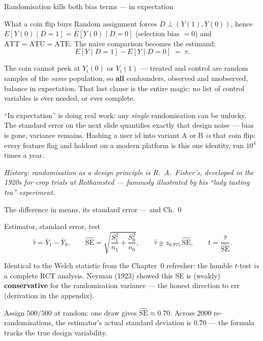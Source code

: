 \documentclass[aspectratio=169,11pt]{beamer}
\begin{document}
\begin{frame}{Randomisation kills both bias terms --- in expectation}
  \fontsize{7}{8.4}\selectfont
  \begin{block}{What a coin flip buys}
    Random assignment forces $D \perp (Y(1),Y(0))$, hence
    $E[Y(0)\mid D{=}1] = E[Y(0)\mid D{=}0]$ (selection bias $=0$) and
    $\text{ATT}=\text{ATU}=\text{ATE}$. The naive comparison becomes the estimand:
    \[
      \boxed{\;E[Y\mid D=1]-E[Y\mid D=0] \;=\; \tau.\;}
    \]
  \end{block}
  \begin{readme}
    The coin cannot peek at $Y_i(0)$ or $Y_i(1)$ --- treated and control are random
    samples of the \emph{same} population, so \textbf{all} confounders, observed and
    unobserved, balance in expectation. That last clause is the entire magic: no list of
    control variables is ever needed, or ever complete.
  \end{readme}
  \begin{takeaway}
    ``In expectation'' is doing real work: any \emph{single} randomisation can be
    unlucky. The standard error on the next slide quantifies exactly that design noise
    --- bias is gone, variance remains. Hashing a user id into variant A or B \emph{is}
    that coin flip: every feature flag and holdout on a modern platform is this one
    identity, run $10^4$ times a year.
  \end{takeaway}
  \par{\tiny\itshape\color{gray}History: randomisation as a design
  principle is R.~A.\ Fisher's, developed in the 1920s for crop trials at
  Rothamsted --- famously illustrated by his ``lady tasting tea'' experiment.}
\end{frame}

\begin{frame}{The difference in means, its standard error --- and Ch.\ 0}
  \begin{block}{Estimator, standard error, test}
    \[
      \hat\tau = \bar Y_1 - \bar Y_0, \qquad
      \widehat{\mathrm{SE}} = \sqrt{\frac{S_1^2}{n_1} + \frac{S_0^2}{n_0}}, \qquad
      \hat\tau \pm z_{0.975}\,\widehat{\mathrm{SE}}, \qquad
      t = \frac{\hat\tau}{\widehat{\mathrm{SE}}}.
    \]
  \end{block}
  \begin{readme}
    Identical to the Welch statistic from the Chapter~0 refresher: the humble $t$-test
    \emph{is} a complete RCT analysis. Neyman (1923) showed this SE is (weakly)
    \textbf{conservative} for the randomisation variance --- the honest direction to err
    (derivation in the appendix).
  \end{readme}
  \begin{numexample}
    Assign $500/500$ at random: one draw gives $\widehat{\mathrm{SE}} \approx 0.70$.
    Across $2000$ re-randomisations, the estimator's actual standard deviation is
    $0.70$ --- the formula tracks the true design variability.
  \end{numexample}
\end{frame}
\end{document}
